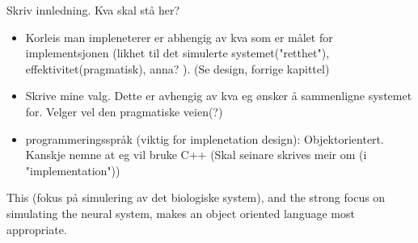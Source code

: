 
Skriv innledning. Kva skal stå her?
\begin{itemize}
	\item Korleis man impleneterer er abhengig av kva som er målet for implementsjonen (likhet til det simulerte systemet("retthet"), effektivitet(pragmatisk), anna? ). (Se design, forrige kapittel)%
	\item Skrive mine valg. Dette er avhengig av kva eg ønsker å sammenligne systemet for. Velger vel den pragmatiske veien(?)
	\item programmeringsspråk (viktig for implenetation design): Objektorientert. Kanskje nemne at eg vil bruke C++ (Skal seinare skrives meir om (i "implementation"))
\end{itemize}

	This (fokus på simulering av det biologiske system), and the strong focus on simulating the neural system, makes an object oriented language most appropriate. 



